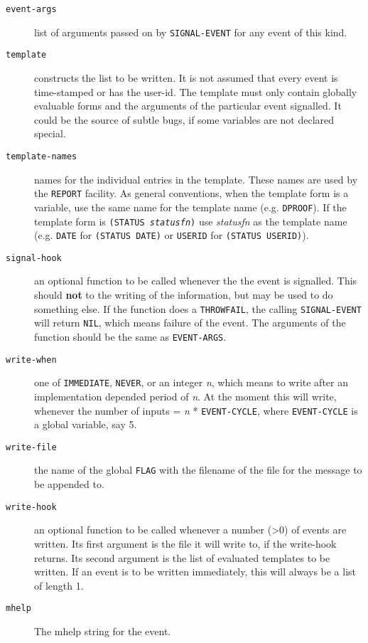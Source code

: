 \begin{description}

\item [{\tt event-args}]  list of arguments passed on by {\tt SIGNAL-EVENT} for any event
	of this kind.

\item [{\tt template}]  constructs the list to be written.  
        It is not assumed that every event is
	time-stamped or has the user-id.  The template
        must only contain globally evaluable forms and the arguments
	of the particular event signalled.  It could be the source of
        subtle bugs, if some variables are not declared special.

\item [{\tt template-names}]  names for the individual entries in the template.
These names are used by the {\tt REPORT} facility.  As general conventions,
when the template form is a variable, use the same name for the
template name (e.g. {\tt DPROOF}).  If the template form is {\tt (STATUS {\it statusfn})}
use {\it statusfn} as the template name (e.g. {\tt DATE} for {\tt (STATUS DATE)} or
{\tt USERID} for {\tt (STATUS USERID)}).

\item [{\tt signal-hook}]  an optional function to be called whenever the
	the event is signalled.  This should {\bf not} to the writing of
	the information, but may be used to do something else.  If the
        function does a {\tt THROWFAIL}, the calling {\tt SIGNAL-EVENT} will
        return {\tt NIL}, which means failure of the event.  The arguments
        of the function should be the same as {\tt EVENT-ARGS}.

\item [{\tt write-when}]  one of {\tt IMMEDIATE}, {\tt NEVER}, or an integer {\it n}, which means
     to write after an implementation depended period of {\it n}.
     At the moment this will write, whenever the number of inputs = {\it n}
     * {\tt EVENT-CYCLE}, where {\tt EVENT-CYCLE} is a global variable, say 5.

\item [{\tt write-file}]  the name of the global {\tt FLAG} with the filename of the
     file for the message to be appended to.

\item [{\tt write-hook}]  an optional function to be called whenever a number
	(>0) of events are written.  Its first argument is the file it will
        write to, if the write-hook returns.  Its second argument is the
        list of evaluated templates to be written.  If an event is to be
        written immediately, this will always be a list of length 1.

\item [{\tt mhelp}]  The mhelp string for the event.
\end{description}

